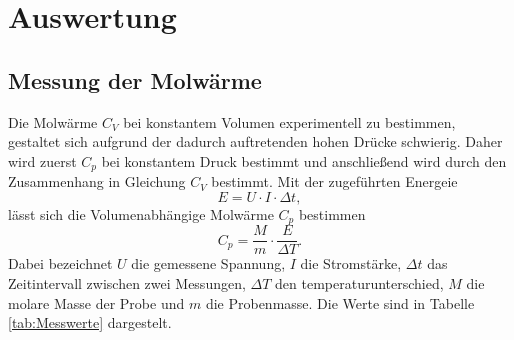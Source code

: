 \section{Auswertung}
\label{sec:Auswertung}
\subsection{Messung der Molwärme}

Die Molwärme $C_V$ bei konstantem Volumen experimentell zu bestimmen,
gestaltet sich aufgrund der dadurch auftretenden hohen Drücke schwierig.
Daher wird zuerst $C_p$ bei konstantem Druck bestimmt 
und anschließend wird durch den Zusammenhang in Gleichung  $C_V$ bestimmt.
Mit der zugeführten Energeie
\begin{equation*}
    E = U\cdot I \cdot \Delta t,
\end{equation*}
lässt sich die Volumenabhängige Molwärme $C_p$ bestimmen
\begin{equation*}
    C_p = \frac{M}{m} \cdot \frac{E}{\Delta T}.
\end{equation*}
Dabei bezeichnet $U$ die gemessene Spannung,
$I$ die Stromstärke, 
$\Delta t$ das Zeitintervall zwischen zwei Messungen,
$\Delta T$ den temperaturunterschied,
$M$ die molare Masse der Probe und
$m$ die Probenmasse.
Die  Werte sind in Tabelle \eqref{tab:Messwerte} dargestelt.


